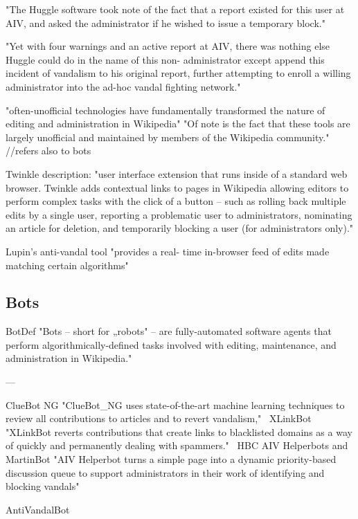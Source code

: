 "The Huggle software took note of the
fact that a report existed for this user at AIV, and asked the
administrator if he wished to issue a temporary block."

"Yet with four warnings and an active report at AIV, there was
nothing else Huggle could do in the name of this non-
administrator except append this incident of vandalism to his
original report, further attempting to enroll a willing
administrator into the ad-hoc vandal fighting network."

\cite{GeiRib2010}
"often-unofficial technologies have fundamentally
transformed the nature of editing and administration in
Wikipedia"
"Of note is the fact that these tools are largely
unofficial and maintained by members of the Wikipedia
community."
//refers also to bots

\cite{GeiRib2010}
Twinkle description:
"user interface extension that runs inside
of a standard web browser. Twinkle adds contextual links to
pages in Wikipedia allowing editors to perform complex tasks
with the click of a button – such as rolling back multiple edits
by a single user, reporting a problematic user to
administrators, nominating an article for deletion, and
temporarily blocking a user (for administrators only)."

Lupin's anti-vandal tool
"provides a real-
time in-browser feed of edits made matching certain
algorithms"

\subsection{Bots}

\cite{GeiRib2010}
BotDef
"Bots – short for „robots" – are fully-automated software
agents that perform algorithmically-defined tasks involved
with editing, maintenance, and administration in Wikipedia."

---

ClueBot NG
"ClueBot\_NG uses state-of-the-art machine learning techniques to review all contributions to
articles and to revert vandalism,"~\cite{HalRied2012}
XLinkBot
"XLinkBot reverts contributions that create links to
blacklisted domains as a way of quickly and permanently dealing with spammers."~\cite{HalRied2012}
HBC AIV Helperbots and MartinBot
"AIV Helperbot turns a simple page into a dynamic
priority-based discussion queue to support administrators in their work of identifying and
blocking vandals"~\cite{HalRied2012}

AntiVandalBot~\cite{HalRied2012}

